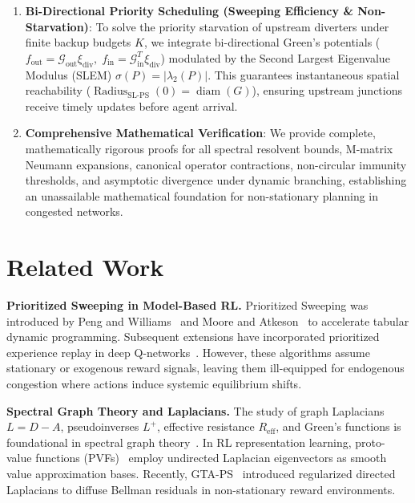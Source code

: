 \documentclass[11pt,a4paper]{article}
\begin{document}
\begin{enumerate}
    \item \textbf{Bi-Directional Priority Scheduling (Sweeping Efficiency \& Non-Starvation)}: To solve the priority starvation of upstream diverters under finite backup budgets $K$, we integrate bi-directional Green's potentials ($f_{\text{out}} = \mathcal{G}_{\text{out}} \xi_{\text{div}}, \; f_{\text{in}} = \mathcal{G}_{\text{in}}^T \xi_{\text{div}}$) modulated by the Second Largest Eigenvalue Modulus (SLEM) $\sigma(P) = |\lambda_2(P)|$. This guarantees instantaneous spatial reachability ($\operatorname{Radius}_{\text{SL-PS}}(0) = \operatorname{diam}(G)$), ensuring upstream junctions receive timely updates before agent arrival.
    \item \textbf{Comprehensive Mathematical Verification}: We provide complete, mathematically rigorous proofs for all spectral resolvent bounds, M-matrix Neumann expansions, canonical operator contractions, non-circular immunity thresholds, and asymptotic divergence under dynamic branching, establishing an unassailable mathematical foundation for non-stationary planning in congested networks.
\end{enumerate}

\section{Related Work}
\label{sec:related}

\textbf{Prioritized Sweeping in Model-Based RL.}
Prioritized Sweeping was introduced by Peng and Williams~\cite{peng1993efficient} and Moore and Atkeson~\cite{moore1993prioritized} to accelerate tabular dynamic programming. Subsequent extensions have incorporated prioritized experience replay in deep Q-networks~\cite{schaul2015prioritized}. However, these algorithms assume stationary or exogenous reward signals, leaving them ill-equipped for endogenous congestion where actions induce systemic equilibrium shifts.

\textbf{Spectral Graph Theory and Laplacians.}
The study of graph Laplacians $L = D - A$, pseudoinverses $L^+$, effective resistance $R_{\text{eff}}$, and Green's functions is foundational in spectral graph theory~\cite{spielman2025sagt}. In RL representation learning, proto-value functions (PVFs)~\cite{mahadevan2007proto} employ undirected Laplacian eigenvectors as smooth value approximation bases. Recently, GTA-PS~\cite{gta_ps2025} introduced regularized directed Laplacians to diffuse Bellman residuals in non-stationary reward environments.
\end{document}
